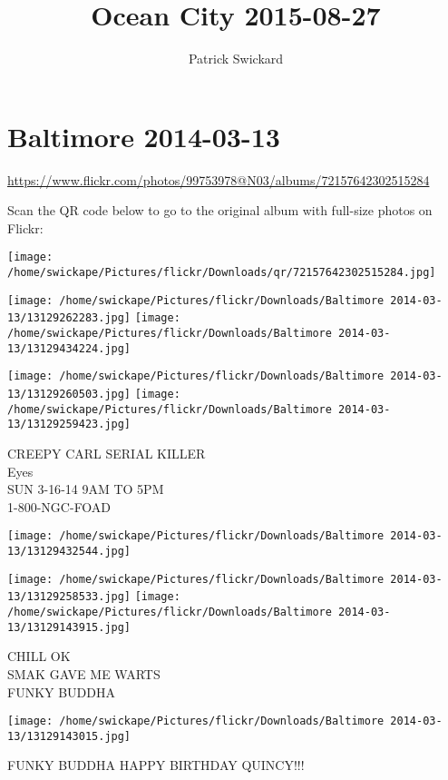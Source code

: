 \documentclass[10pt,letterpaper]{article}
\title{Ocean City 2015-08-27}
\author{Patrick Swickard}
\date{}
\begin{document}
\section*{Baltimore 2014-03-13}

\url{https://www.flickr.com/photos/99753978@N03/albums/72157642302515284}

Scan the QR code below to go to the original album with full-size photos on Flickr:

\texttt{[image: /home/swickape/Pictures/flickr/Downloads/qr/72157642302515284.jpg]}
\pagebreak

\texttt{[image: /home/swickape/Pictures/flickr/Downloads/Baltimore 2014-03-13/13129262283.jpg]}
\texttt{[image: /home/swickape/Pictures/flickr/Downloads/Baltimore 2014-03-13/13129434224.jpg]}

\texttt{[image: /home/swickape/Pictures/flickr/Downloads/Baltimore 2014-03-13/13129260503.jpg]}
\texttt{[image: /home/swickape/Pictures/flickr/Downloads/Baltimore 2014-03-13/13129259423.jpg]}

CREEPY CARL SERIAL KILLER\\
Eyes\\
SUN 3{-}16{-}14 9AM TO 5PM\\
1{-}800{-}NGC{-}FOAD
\pagebreak

\texttt{[image: /home/swickape/Pictures/flickr/Downloads/Baltimore 2014-03-13/13129432544.jpg]}

\vspace{0.25in}
\texttt{[image: /home/swickape/Pictures/flickr/Downloads/Baltimore 2014-03-13/13129258533.jpg]}
\texttt{[image: /home/swickape/Pictures/flickr/Downloads/Baltimore 2014-03-13/13129143915.jpg]}

CHILL OK\\
SMAK GAVE ME WARTS\\
FUNKY BUDDHA
\pagebreak

\texttt{[image: /home/swickape/Pictures/flickr/Downloads/Baltimore 2014-03-13/13129143015.jpg]}

FUNKY BUDDHA HAPPY BIRTHDAY QUINCY!!!
\pagebreak
\end{document}
